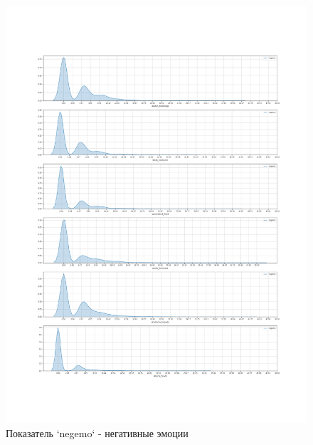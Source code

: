 \documentclass[11pt]{article}
\begin{document}
\begin{figure}
\centering
\includegraphics[width=\textwidth]{negemo.png}
\caption{Показатель `negemo` - негативные эмоции}\label{negemo}
\end{figure}
\end{document}
